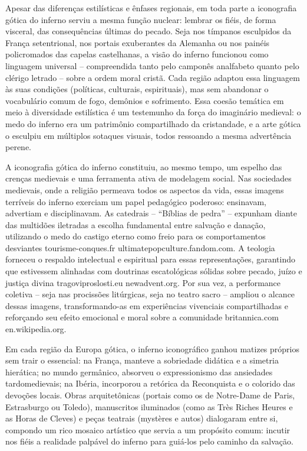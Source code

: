 Apesar das diferenças estilísticas e ênfases regionais, em toda parte a iconografia gótica do inferno serviu a mesma função nuclear: lembrar os fiéis, de forma visceral, das consequências últimas do pecado. Seja nos tímpanos esculpidos da França setentrional, nos portais exuberantes da Alemanha ou nos painéis policromados das capelas castelhanas, a visão do inferno funcionou como linguagem universal -- compreendida tanto pelo camponês analfabeto quanto pelo clérigo letrado -- sobre a ordem moral cristã. Cada região adaptou essa linguagem às suas condições (políticas, culturais, espirituais), mas sem abandonar o vocabulário comum de fogo, demônios e sofrimento. Essa coesão temática em meio à diversidade estilística é um testemunho da força do imaginário medieval: o medo do inferno era um patrimônio compartilhado da cristandade, e a arte gótica o esculpiu em múltiplos sotaques visuais, todos ressoando a mesma advertência perene.

A iconografia gótica do inferno constituiu, ao mesmo tempo, um espelho das crenças medievais e uma ferramenta ativa de modelagem social. Nas sociedades medievais, onde a religião permeava todos os aspectos da vida, essas imagens terríveis do inferno exerciam um papel pedagógico poderoso: ensinavam, advertiam e disciplinavam. As catedrais -- “Bíblias de pedra” -- expunham diante das multidões iletradas a escolha fundamental entre salvação e danação, utilizando o medo do castigo eterno como freio para os comportamentos desviantes tourisme-conques.fr ultimatepopculture.fandom.com. A teologia forneceu o respaldo intelectual e espiritual para essas representações, garantindo que estivessem alinhadas com doutrinas escatológicas sólidas sobre pecado, juízo e justiça divina tragoviproslosti.eu newadvent.org. Por sua vez, a performance coletiva -- seja nas procissões litúrgicas, seja no teatro sacro -- ampliou o alcance dessas imagens, transformando-as em experiências vivenciais compartilhadas e reforçando seu efeito emocional e moral sobre a comunidade britannica.com en.wikipedia.org.

Em cada região da Europa gótica, o inferno iconográfico ganhou matizes próprios sem trair o essencial: na França, manteve a sobriedade didática e a simetria hierática; no mundo germânico, absorveu o expressionismo das ansiedades tardomedievais; na Ibéria, incorporou a retórica da Reconquista e o colorido das devoções locais. Obras arquitetônicas (portais como os de Notre-Dame de Paris, Estrasburgo ou Toledo), manuscritos iluminados (como as Très Riches Heures e as Horas de Cleves) e peças teatrais (mystères e autos) dialogaram entre si, compondo um rico mosaico artístico que servia a um propósito comum: incutir nos fiéis a realidade palpável do inferno para guiá-los pelo caminho da salvação.


